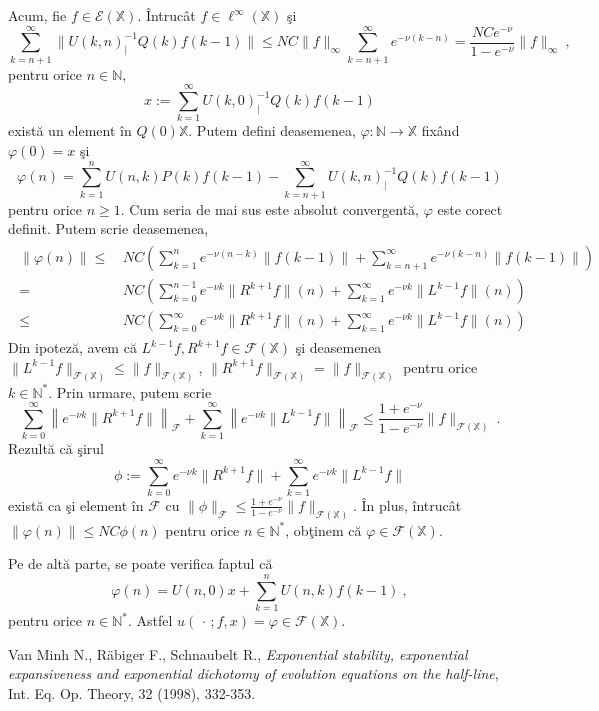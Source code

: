 \documentclass[ a4paper, 12pt]{report}
\newcommand{\E}{\mathcal{E}}
\newcommand{\F}{\mathcal{F}}
\newcommand{\N}{\mathbb{N}}
\newcommand{\X}{\mathbb{X}}
\theoremstyle{definition}
\theoremstyle{remark}
\numberwithin{equation}{section}
\begin{document}
Acum, fie $f\in\E(\X)$. \^Intruc\^at $f\in\ell^{\infty}(\X)$ \c si
$$ \sum_{k=n+1}^{\infty} \|U(k,n)_{|}^{-1}Q(k)f(k-1)\| \leq NC\|f\|_{\infty} \sum_{k=n+1}^{\infty} e^{-\nu(k-n)}=
 \frac{NCe^{-\nu}}{1-e^{-\nu}}\|f\|_{\infty}\ ,$$
pentru orice $n\in\N$,
$$ x:= \sum_{k=1}^{\infty} U(k,0)_{|}^{-1}Q(k)f(k-1)$$
exist\u a  un element \^in $Q(0)\X$.
Putem defini deasemenea, $\varphi:\N\to\X$ fix\^and $\varphi(0)=x$ \c si
\begin{equation}
\varphi(n)= \sum_{k=1}^{n} U(n,k) P(k)f(k-1) - \sum_{k=n+1}^{\infty} U(k,n)_{|}^{-1}Q(k)f(k-1)
\end{equation}
pentru orice $n\geq1$.
Cum seria de mai sus este absolut convergent\u a, $\varphi$ este corect definit.
Putem scrie deasemenea,
\begin{gather*}
\begin{split}
\|\varphi(n)\|\leq &\, NC \left(\sum_{k=1}^{n}e^{-\nu(n-k)}\|f(k-1)\|  +
   \sum_{k=n+1}^{\infty} e^{-\nu(k-n)}\|f(k-1)\| \right)\\
   = &\, NC \left(\sum_{k=0}^{n-1}e^{-\nu k}\|R^{k+1} f\|(n)  +
   \sum_{k=1}^{\infty} e^{-\nu k}\|L^{k-1} f\|(n) \right)\\
   \leq &\, NC \left(\sum_{k=0}^{\infty} e^{-\nu k}\|R^{k+1} f\|(n)  +
   \sum_{k=1}^{\infty} e^{-\nu k}\|L^{k-1} f\|(n) \right)
\end{split}
\end{gather*}
Din ipotez\u a, avem c\u a $L^{k-1} f, R^{k+1} f\in\F(\X)$ \c si deasemenea
$\|L^{k-1}f\|_{\F(\X)}\leq \|f\|_{\F(\X)}$, $\|R^{k+1}f\|_{\F(\X)}= \|f\|_{\F(\X)}$ pentru orice $k\in\N^*$.
Prin urmare, putem scrie
$$\sum_{k=0}^{\infty}\left\| e^{-\nu k}\|R^{k+1} f\|\right\|_{\F}  +
   \sum_{k=1}^{\infty} \left\|e^{-\nu k}\|L^{k-1} f\|\right\|_{\F} \leq \frac{1+e^{-\nu}}{1-e^{-\nu}}\|f\|_{\F(\X)}\ .$$
Rezult\u a c\u a \c sirul
$$\phi:= \sum_{k=0}^{\infty} e^{-\nu k}\|R^{k+1} f\| +\sum_{k=1}^{\infty} e^{-\nu k}\|L^{k-1} f\| $$
exist\u a ca \c si element \^in $\F$ cu $\|\phi\|_{\F}\leq \frac{1+e^{-\nu}}{1-e^{-\nu}}\|f\|_{\F(\X)}$.
\^In plus, \^intruc\^at
$\|\varphi(n)\|\leq NC\phi(n)$ pentru orice $n\in\N^*$, ob\c tinem c\u a $\varphi\in\F(\X)$.

Pe de alt\u a parte, se poate verifica faptul c\u a
$$\varphi(n) = U(n,0)x + \sum_{k=1}^{n}U(n,k)f(k-1)\ ,$$
pentru orice $n\in\N^*$. Astfel $u(\,\cdot\,;f,x)=\varphi\in\F(\X)$.





\begin{thebibliography}{}

Van Minh N., R\"{a}biger F., Schnaubelt R.,
\emph{Exponential stability, exponential expansiveness and exponential
dichotomy of evolution equations on the half-line}, Int. Eq. Op. Theory, 32 (1998), 332-353.


\end{thebibliography}{}
\end{document}
